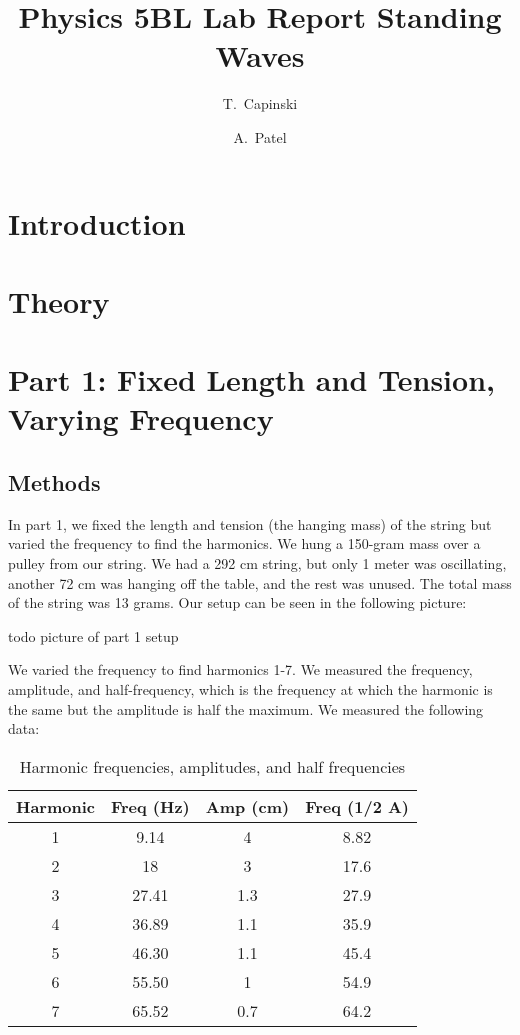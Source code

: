 \documentclass[11pt]{article}
\title{Physics 5BL Lab Report Standing Waves}
\author{T.~Capinski \and A.~Patel}
\let\oldsection\section
\renewcommand\section{\clearpage\oldsection}
\begin{document}
    \maketitle
    \tableofcontents

    \section*{Introduction}\label{sec:introduction}

    \section*{Theory}\label{sec:theory}

    \section{Part 1: Fixed Length and Tension, Varying Frequency}\label{sec:part_1}
    \subsection{Methods}\label{subsec:part_1_methods}
    In part 1, we fixed the length and tension (the hanging mass) of the string but varied the frequency to find the harmonics. We hung a 150-gram mass over a pulley from our string. We had a 292 cm string, but only 1 meter was oscillating, another 72 cm was hanging off the table, and the rest was unused. The total mass of the string was 13 grams. Our setup can be seen in the following picture:

    {todo picture of part 1 setup}

    We varied the frequency to find harmonics 1-7. We measured the frequency, amplitude, and half-frequency, which is the frequency at which the harmonic is the same but the amplitude is half the maximum. We measured the following data:

    \begin{table}[h]
    \centering
    \begin{tabular}{|c|c|c|c|}
    \hline
    \textbf{Harmonic} & \textbf{Freq (Hz)} & \textbf{Amp (cm)} & \textbf{Freq (1/2 A)} \\
    \hline
    1 & 9.14 & 4 & 8.82 \\
    2 & 18 & 3 & 17.6 \\
    3 & 27.41 & 1.3 & 27.9 \\
    4 & 36.89 & 1.1 & 35.9 \\
    5 & 46.30 & 1.1 & 45.4 \\
    6 & 55.50 & 1 & 54.9 \\
    7 & 65.52 & 0.7 & 64.2 \\
    \hline
    \end{tabular}
    \caption{Harmonic frequencies, amplitudes, and half frequencies}
    \label{tab:harmonics}
    \end{table}
    
\end{document}

